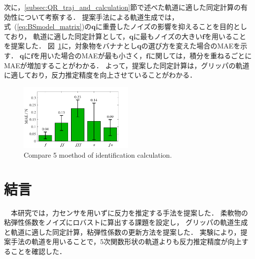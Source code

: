\documentclass[a4paper]{jarticle}
\begin{document}
次に，\ref{subsec:QR_traj_and_calculation}節で述べた軌道に適した同定計算の有効性について考察する．
提案手法による軌道生成では，式~(\ref{eq:BSmodel_matrix})の$\mathbf{q}$に重畳したノイズの影響を抑えることを目的としており，
軌道に適した同定計算として，$\mathbf{q}$に最もノイズの大きい$\boldsymbol{f}$を用いることを提案した．
図~\ref{fig:compare_select5mode}に，対象物をバナナとし$\mathbf{q}$の選び方を変えた場合のMAEを示す．
$\mathbf{q}$に$\boldsymbol{f}$を用いた場合のMAEが最も小さく，$\boldsymbol{{f}}$に関しては，積分を重ねるごとにMAEが増加することがわかる．
よって，提案した同定計算は，グリッパの軌道に適しており，反力推定精度を向上させていることがわかる．
\begin{figure}[t]
    \centering
    \includegraphics[width=0.5\textwidth]{select_differet_q_chicken.pdf}
    \captionsetup{width=0.9\linewidth} %
    \caption{Compare 5 moethod of identification calculation.}
    \label{fig:compare_select5mode}
\end{figure}
\section{結言}
　本研究では，力センサを用いずに反力を推定する手法を提案した．
柔軟物の粘弾性係数をノイズにロバストに算出する課題を設定し，
グリッパの軌道生成と軌道に適した同定計算，粘弾性係数の更新方法を提案した．
実験により，提案手法の軌道を用いることで，5次関数形状の軌道よりも反力推定精度が向上することを確認した．
\end{document}
